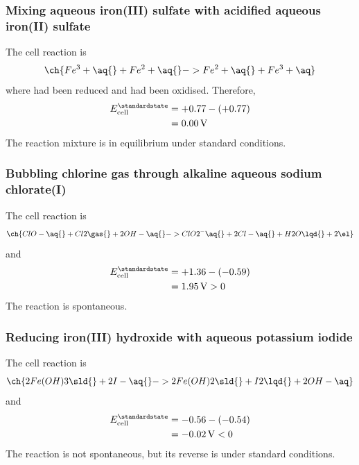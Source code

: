 \subsubsection{Mixing aqueous iron(III) sulfate with acidified aqueous iron(II) sulfate}
The cell reaction is
\begin{equation*}
	\ch{Fe^3+ \aq{} + Fe^2+ \aq{} -> Fe^2+ \aq{} + Fe^3+ \aq}
\end{equation*}
where  had been reduced and  had been oxidised.
Therefore,
\begin{align*}
	E^\standardstate_\text{cell} & = +0.77 - (+0.77)   \\
	                             & = \qty{0.00}{\volt}
\end{align*}
The reaction mixture is {\color{accent} in equilibrium} under standard conditions.

\subsubsection {Bubbling chlorine gas through alkaline aqueous sodium chlorate(I)}
The cell reaction is
\begin{equation*}
	\ch{ClO- \aq{} + Cl2 \gas{} + 2 OH- \aq{} -> ClO2^- \aq{} + 2 Cl- \aq{} + H2O \lqd{} + 2 \el}
\end{equation*}
and
\begin{align*}
	E^\standardstate_\text{cell} & = +1.36 - (-0.59)       \\
	                             & = \qty{1.95}{\volt} > 0
\end{align*}
The reaction is {\color{accent} spontaneous}.

\subsubsection {Reducing iron(III) hydroxide with aqueous potassium iodide}
The cell reaction is
\begin{equation*}
	\ch{2 Fe(OH)3 \sld{} + 2 I- \aq{} -> 2 Fe(OH)2 \sld{} + I2 \lqd{} + 2 OH- \aq}
\end{equation*}
and
\begin{align*}
	E^\standardstate_\text{cell} & = -0.56 - (-0.54)        \\
	                             & = \qty{-0.02}{\volt} < 0
\end{align*}
The reaction is {\color{accent} not spontaneous}, but its reverse is under
standard conditions.

